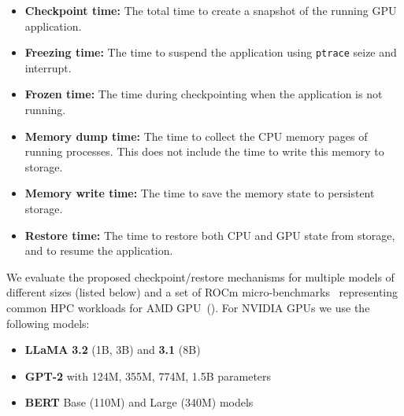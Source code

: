 \begin{itemize}[leftmargin=*,leftmargin=10pt,itemindent=0pt]
    \item \textbf{Checkpoint time:} The total time to create a snapshot of the running GPU application.
    \item \textbf{Freezing time:} The time to suspend the application using \texttt{ptrace} seize and interrupt.
    \item \textbf{Frozen time:} The time during checkpointing when the application is not running.
    \item \textbf{Memory dump time:} The time to collect the CPU memory pages of running processes. This does not include the time to write this memory to storage.
    \item \textbf{Memory write time:} The time to save the memory state to persistent storage.
    \item \textbf{Restore time:} The time to restore both CPU and GPU state from storage, and to resume the application.
\end{itemize}

 We evaluate the proposed checkpoint/restore mechanisms for multiple models of different sizes (listed below) and a set of ROCm micro-benchmarks~\cite{amd2024rocm} representing common HPC workloads for AMD GPU~(\textsection{\ref{sec:eval:rocm}}). For NVIDIA GPUs we use the following models:

\begin{itemize}[leftmargin=*,leftmargin=10pt,itemindent=0pt]
    \item \textbf{LLaMA} \textbf{3.2} (1B, 3B) and \textbf{3.1} (8B)

    \item \textbf{GPT-2} with 124M, 355M, 774M, 1.5B parameters

    \item \textbf{BERT} Base (110M) and Large (340M) models
\end{itemize}
%

